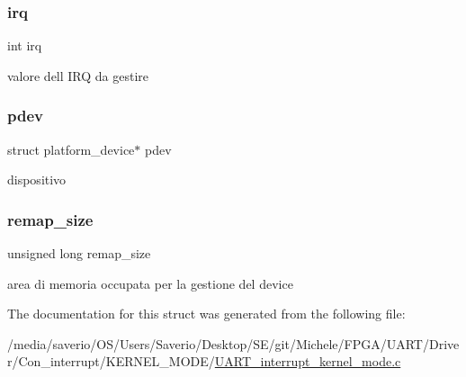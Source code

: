 \subsubsection{\texorpdfstring{irq}{irq}}
{\footnotesize\ttfamily int irq}

valore dell\textquotesingle{} I\+RQ da gestire \mbox{\label{structmydriver__dm_a6fb27e0c8e2d8544acca44725266b5d3}} 
\subsubsection{\texorpdfstring{pdev}{pdev}}
{\footnotesize\ttfamily struct platform\+\_\+device$\ast$ pdev}

dispositivo \mbox{\label{structmydriver__dm_a0c549abf29e1024c458fe99717714be1}} 
\subsubsection{\texorpdfstring{remap\+\_\+size}{remap\_size}}
{\footnotesize\ttfamily unsigned long remap\+\_\+size}

area di memoria occupata per la gestione del device 

The documentation for this struct was generated from the following file\+:\begin{DoxyCompactItemize}
\item 
/media/saverio/\+O\+S/\+Users/\+Saverio/\+Desktop/\+S\+E/git/\+Michele/\+F\+P\+G\+A/\+U\+A\+R\+T/\+Driver/\+Con\+\_\+interrupt/\+K\+E\+R\+N\+E\+L\+\_\+\+M\+O\+D\+E/\hyperlink{UART__interrupt__kernel__mode_8c}{U\+A\+R\+T\+\_\+interrupt\+\_\+kernel\+\_\+mode.\+c}\end{DoxyCompactItemize}
